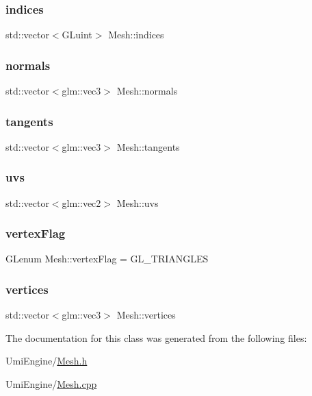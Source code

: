 \subsubsection{\texorpdfstring{indices}{indices}}
{\footnotesize\ttfamily std\+::vector$<$G\+Luint$>$ Mesh\+::indices}

\mbox{\label{class_mesh_a51622ff35f286e2015954aad76ee4bc2}} 
\subsubsection{\texorpdfstring{normals}{normals}}
{\footnotesize\ttfamily std\+::vector$<$glm\+::vec3$>$ Mesh\+::normals}

\mbox{\label{class_mesh_aabfc88c0c59371aca2d8fe6227a1c3f1}} 
\subsubsection{\texorpdfstring{tangents}{tangents}}
{\footnotesize\ttfamily std\+::vector$<$glm\+::vec3$>$ Mesh\+::tangents}

\mbox{\label{class_mesh_af98b594a339f9e92ed0a4e1e4d84a6d9}} 
\subsubsection{\texorpdfstring{uvs}{uvs}}
{\footnotesize\ttfamily std\+::vector$<$glm\+::vec2$>$ Mesh\+::uvs}

\mbox{\label{class_mesh_aa4fa174a34713f4f3286bd202d5d3617}} 
\subsubsection{\texorpdfstring{vertexFlag}{vertexFlag}}
{\footnotesize\ttfamily G\+Lenum Mesh\+::vertex\+Flag = G\+L\+\_\+\+T\+R\+I\+A\+N\+G\+L\+ES}

\mbox{\label{class_mesh_aee572fab7113a18cf174a8418394aef4}} 
\subsubsection{\texorpdfstring{vertices}{vertices}}
{\footnotesize\ttfamily std\+::vector$<$glm\+::vec3$>$ Mesh\+::vertices}



The documentation for this class was generated from the following files\+:\begin{DoxyCompactItemize}
\item 
Umi\+Engine/\mbox{\hyperlink{_mesh_8h}{Mesh.\+h}}\item 
Umi\+Engine/\mbox{\hyperlink{_mesh_8cpp}{Mesh.\+cpp}}\end{DoxyCompactItemize}

